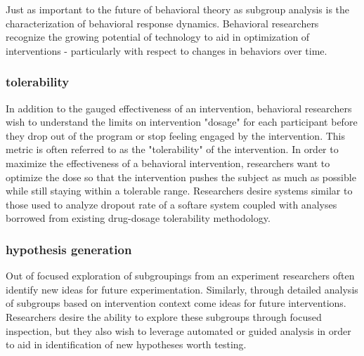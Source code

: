 Just as important to the future of behavioral theory as subgroup analysis is the characterization of behavioral response dynamics.
Behavioral researchers recognize the growing potential of technology to aid in optimization of interventions - particularly with respect to changes in behaviors over time. 

\subsubsection{tolerability} 
In addition to the gauged effectiveness of an intervention, behavioral researchers wish to understand the limits on intervention "dosage" for each participant before they drop out of the program or stop feeling engaged by the intervention.
This metric is often referred to as the "tolerability" of the intervention.
In order to maximize the effectiveness of a behavioral intervention, researchers want to optimize the dose so that the intervention pushes the subject as much as possible while still staying within a tolerable range.
Researchers desire systems similar to those used to analyze dropout rate of a softare system coupled with analyses borrowed from existing drug-dosage tolerability methodology.


\subsubsection{hypothesis generation}
Out of focused exploration of subgroupings from an experiment researchers often identify new ideas for future experimentation.
Similarly, through detailed analysis of subgroups based on intervention context come ideas for future interventions.
Researchers desire the ability to explore these subgroups through focused inspection, but they also wish to leverage automated or guided analysis in order to aid in identification of new hypotheses worth testing.

